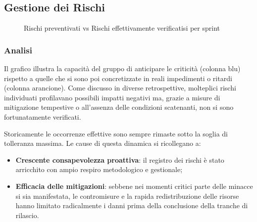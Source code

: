 \documentclass[a4paper,11pt,oneside]{scrartcl}
\begin{document}
\subsection{Gestione dei Rischi}

\begin{figure}[H]
\centering
{}
\caption{Rischi preventivati vs Rischi effettivamente verificatisi per sprint}
\label{fig:rischi}
\end{figure}

\subsubsection*{Analisi}

Il grafico illustra la capacità del gruppo di anticipare le criticità (colonna blu) rispetto a quelle che si sono poi concretizzate in reali impedimenti o ritardi (colonna arancione). Come discusso in diverse retrospettive, molteplici rischi individuati profilavano possibili impatti negativi ma, grazie a misure di mitigazione tempestive o all'assenza delle condizioni scatenanti, non si sono fortunatamente verificati. 

Storicamente le occorrenze effettive sono sempre rimaste sotto la soglia di tolleranza massima.
Le cause di questa dinamica si ricollegano a:
\begin{itemize}
    \item \textbf{Crescente consapevolezza proattiva}: il registro dei rischi è stato arricchito con ampio respiro metodologico e gestionale;
    \item \textbf{Efficacia delle mitigazioni}: sebbene nei momenti critici parte delle minacce si sia manifestata, le contromisure e la rapida redistribuzione delle risorse hanno limitato radicalmente i danni prima della conclusione della tranche di rilascio.
\end{itemize}
\end{document}
